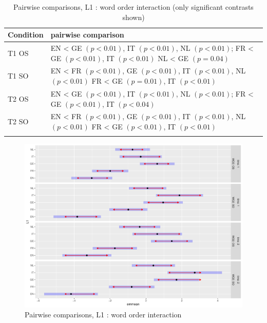 \begin{table}
    \begin{tabularx}{\textwidth}{lQ}
    \lsptoprule
    Condition & pairwise comparison\\
    \midrule
    T1 OS & EN < GE $(p < 0.01)$, IT $(p < 0.01)$, NL $(p < 0.01)$;\newline
    FR < GE $(p < 0.01)$, IT $(p < 0.01)$\newline
    NL < GE $(p = 0.04)$\\
    \tablevspace
    T1 SO & EN < FR $(p < 0.01)$, GE $(p < 0.01)$, IT $(p < 0.01)$, NL $(p < 0.01)$\newline
    FR < GE $(p = 0.01)$, IT $(p < 0.01)$\\
    \tablevspace
    T2 OS & EN < GE $(p < 0.01)$, IT $(p < 0.01)$, NL $(p < 0.01)$;\newline
    FR < GE $(p < 0.01)$, IT $(p < 0.04)$\\
    \tablevspace
    T2 SO & EN < FR $(p < 0.01)$, GE $(p < 0.01)$, IT $(p < 0.01)$, NL $(p < 0.01)$\newline
    FR < GE $(p < 0.01)$, IT $(p < 0.01)$\\
    \lspbottomrule
    \end{tabularx}
    \caption{Pairwise comparisons, L1 : word order interaction (only significant contrasts shown)}
    \label{tab:04:5}
\end{table}

\begin{figure}[p]
    \includegraphics[height=.4\textheight]{figures/04-3.pdf}
    \caption{Pairwise comparisons, L1 : word order interaction}
    \label{fig:04:3}
\end{figure}

